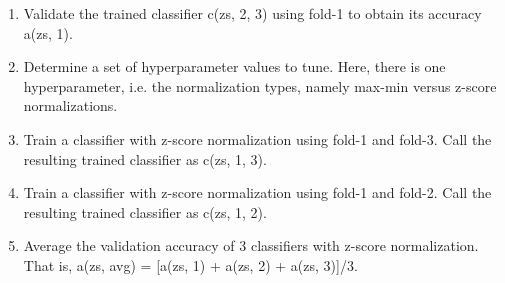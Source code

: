 \documentclass[12pt,a4paper]{article}
\begin{document}
\begin{enumerate}
        fold-2 and fold-3. There are 300 data points per fold.
  \item Validate the trained classifier c(zs, 2, 3) using fold-1 to obtain its accuracy a(zs, 1).
  \item Determine a set of hyperparameter values to tune. Here, there is one hyperparameter, i.e.
        the normalization types, namely max-min versus z-score normalizations.
  \item Train a classifier with z-score normalization using fold-1 and fold-3. Call the resulting trained
        classifier as c(zs, 1, 3).
  \item Train a classifier with z-score normalization using fold-1 and fold-2. Call the resulting trained
        classifier as c(zs, 1, 2).
  \item Average the validation accuracy of 3 classifiers with z-score normalization.
        That is, a(zs, avg) = [a(zs, 1) + a(zs, 2) + a(zs, 3)]/3.
\end{enumerate}
\end{document}

